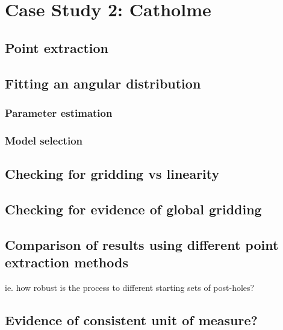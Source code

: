 \documentclass[../../ArchStats.tex]{subfiles}
\begin{document}
\section{Case Study 2: Catholme}
\label{sec:CS2}

\subsection{Point extraction}

\subsection{Fitting an angular distribution}

\subsubsection{Parameter estimation}
\subsubsection{Model selection}

\subsection{Checking for gridding vs linearity}

\subsection{Checking for evidence of global gridding}

\subsection{Comparison of results using different point extraction methods}
ie. how robust is the process to different starting sets of post-holes?

\subsection{Evidence of consistent unit of measure?}
\end{document}
